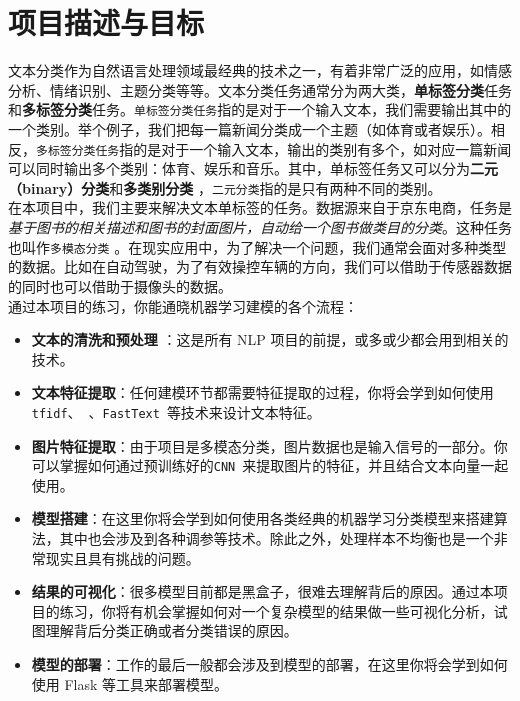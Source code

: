 \section{项目描述与目标}

\noindent 文本分类作为自然语言处理领域最经典的技术之一，有着非常广泛的应用，如情感分析、情绪识别、主题分类等等。文本分类任务通常分为两大类，\textbf{单标签分类}任务和\textbf{多标签分类}任务。\texttt{单标签分类任务}指的是对于一个输入文本，我们需要输出其中的一个类别。举个例子，我们把每一篇新闻分类成一个主题（如体育或者娱乐）。相反，\texttt{多标签分类任务}指的是对于一个输入文本，输出的类别有多个，如对应一篇新闻可以同时输出多个类别：体育、娱乐和音乐。其中，单标签任务又可以分为\textbf{二元（binary）分类}和\textbf{多类别分类} ，\texttt{二元分类}指的是只有两种不同的类别。 \\

\noindent 在本项目中，我们主要来解决文本单标签的任务。数据源来自于京东电商，任务是\textit{基于图书的相关描述和图书的封面图片，自动给一个图书做类目的分类}。这种任务也叫作\texttt{多模态分类} 。在现实应用中，为了解决一个问题，我们通常会面对多种类型的数据。比如在自动驾驶，为了有效操控车辆的方向，我们可以借助于传感器数据的同时也可以借助于摄像头的数据。\\

\noindent 通过本项目的练习，你能通晓机器学习建模的各个流程：
\begin{itemize}
    \item \textbf{文本的清洗和预处理} ：这是所有 NLP 项目的前提，或多或少都会用到相关的技术。
    \item \textbf{文本特征提取}：任何建模环节都需要特征提取的过程，你将会学到如何使用\texttt{tfidf}、~\cite{bojanowski2017enriching}、\texttt{FastText}~\cite{mikolov2013efficient}等技术来设计文本特征。
    \item \textbf{图片特征提取}：由于项目是多模态分类，图片数据也是输入信号的一部分。你可以掌握如何通过预训练好的\texttt{CNN}~\cite{DBLP:journals/corr/Kim14f}来提取图片的特征，并且结合文本向量一起使用。
    \item \textbf{模型搭建}：在这里你将会学到如何使用各类经典的机器学习分类模型来搭建算法，其中也会涉及到各种调参等技术。除此之外，处理样本不均衡也是一个非常现实且具有挑战的问题。
    \item \textbf{结果的可视化}：很多模型目前都是黑盒子，很难去理解背后的原因。通过本项目的练习，你将有机会掌握如何对一个复杂模型的结果做一些可视化分析，试图理解背后分类正确或者分类错误的原因。 
    \item \textbf{模型的部署}：工作的最后一般都会涉及到模型的部署，在这里你将会学到如何使用 Flask 等工具来部署模型。
\end{itemize}

